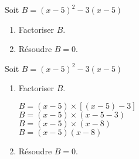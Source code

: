 \begin{exercice*}
    Soit $B=(x-5)^2 - 3(x-5)$
    \begin{enumerate}
        \item Factoriser $B$.
        \item Résoudre $B=0$.
    \end{enumerate}
\end{exercice*}
\begin{corrige}
    Soit $B=(x-5)^2 - 3(x-5)$
    
    \begin{enumerate}
        \item Factoriser $B$.
        
        $B=(x-5)\times[(x-5)-3]$\\
        $B=(x-5)\times(x-5-3)$\\
        $B=(x-5)\times(x-8)$\\
        $B=(x-5)(x-8)$
        \item Résoudre $B=0$.
        
    \end{enumerate}
\end{corrige}